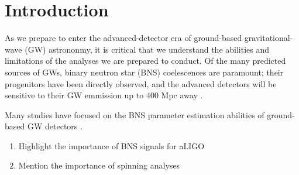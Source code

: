 \section{Introduction}

As we prepare to enter the advanced-detector era of ground-based gravitational-wave (GW) astrononmy, it is critical that we understand the abilities and limitations of the analyses we are prepared to conduct.  Of the many predicted sources of GWs, binary neutron star (BNS) coelescences are paramount; their progenitors have been directly observed, and the advanced detectors will be sensitive to their GW emmission up to 400 Mpc away \cite{2013arXiv1304.0670L}.

Many studies have focused on the BNS parameter estimation abilities of ground-based GW detectors \cite{Nissanke_2010,Nissanke_2011,Aasi_2013,Hannam_2013,Rodriguez_2014,Singer_2014}.

\begin{enumerate}
\item Highlight the importance of BNS signals for aLIGO
\item Mention the importance of spinning analyses
\end{enumerate}